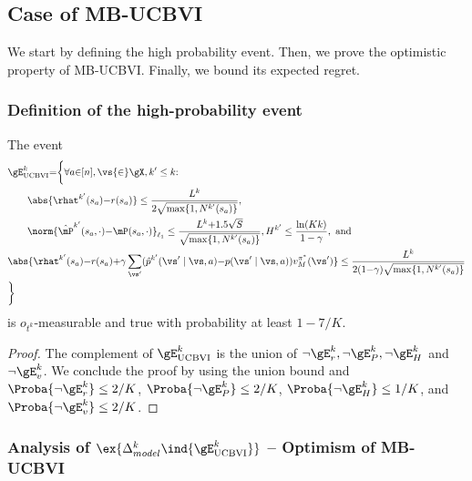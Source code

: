 \begin{subappendices}
\subsection{Case of MB-UCBVI}
\label{ssec:proof_UCBVI}

We start by defining the high probability event. Then, we prove the optimistic property of MB-UCBVI. Finally, we bound its expected regret.

\subsubsection{Definition of the high-probability event}

\begin{lem}
    \label{lem:concentration_ucbvi}
    The event
    \begin{align*}
        &\gE_\text{UCBVI}^{k} {=}\bigg\{ \forall a{\in}[n], \vs{\in}\gX, k'\le k{:} \\
        &\qquad \abs{\rhat^{k'}(s_a){-}r(s_a)} \le\frac{L^{k}}{2\sqrt{\max\{1,N^{k'}(s_a)\} }}, \\
        &\qquad \norm{\hat{\mP}^{k'}(s_a,\cdot) {-}\mP(s_a,\cdot)}_{\ell_1} \le\frac{L^{k}{+}1.5\sqrt{S}}{\sqrt{\max\{1,N^{k'}(s_a)\} }}, H^{k'}\le \frac{\ln(Kk)}{1-\gamma}, \text{ and } \\
        &\abs{\rhat^{k'}(s_a){-}r(s_a) {+}\gamma\sum_{\vs'}(\hat{p}^{k'}(\vs'\mid\vs,a){-}p(\vs'\mid\vs,a))v_M^{\pi^*}(\vs')} \le
    \frac{L^{k}}{2(1{-}\gamma)\sqrt{\max\{1,N^{k'}(s_a)\} }} \\
        &\bigg\}
    \end{align*}
    is $o_{t^k}$-measurable and true with probability at least $1-7/K$.
\end{lem}
\begin{proof}
    The complement of $\gE^{k}_\text{UCBVI}$ is the union of $\neg \gE^{k}_r, \neg \gE^{k}_P, \neg \gE^{k}_H$ and $\neg \gE^{k}_v$.
    We conclude the proof by using the union bound and $\Proba{\neg \gE^{k}_r} \le 2/K$, $\Proba{\neg \gE^{k}_P} \le 2/K$, $\Proba{\neg \gE^{k}_H} \le 1/K$, and $\Proba{\neg \gE^{k}_v} \le 2/K$.
\end{proof}

\subsubsection{Analysis of $\ex{\Delta_{model}^k \ind{\gE^{k}_\text{UCBVI}}}$ -- Optimism of MB-UCBVI}


\end{subappendices}
